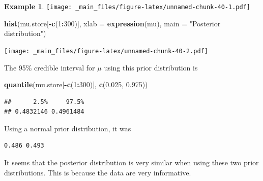 \documentclass[
]{book}
\newenvironment{Shaded}{\begin{snugshade}}{\end{snugshade}}
\newcommand{\AttributeTok}[1]{\textcolor[rgb]{0.13,0.29,0.53}{#1}}
\newcommand{\DecValTok}[1]{\textcolor[rgb]{0.00,0.00,0.81}{#1}}
\newcommand{\FloatTok}[1]{\textcolor[rgb]{0.00,0.00,0.81}{#1}}
\newcommand{\FunctionTok}[1]{\textcolor[rgb]{0.13,0.29,0.53}{\textbf{#1}}}
\newcommand{\NormalTok}[1]{#1}
\newcommand{\SpecialCharTok}[1]{\textcolor[rgb]{0.81,0.36,0.00}{\textbf{#1}}}
\newcommand{\StringTok}[1]{\textcolor[rgb]{0.31,0.60,0.02}{#1}}
\theoremstyle{definition}
\theoremstyle{definition}
\newtheorem{example}{Example}[chapter]
\theoremstyle{definition}
\theoremstyle{definition}
\theoremstyle{remark}
\begin{document}
\begin{example}
\texttt{[image: \_main\_files/figure-latex/unnamed-chunk-40-1.pdf]}

\begin{Shaded}
\begin{Highlighting}[]
\FunctionTok{hist}\NormalTok{(mu.store[}\SpecialCharTok{{-}}\FunctionTok{c}\NormalTok{(}\DecValTok{1}\SpecialCharTok{:}\DecValTok{300}\NormalTok{)], }\AttributeTok{xlab =} \FunctionTok{expression}\NormalTok{(mu), }\AttributeTok{main =} \StringTok{"Posterior distribution"}\NormalTok{)}
\end{Highlighting}
\end{Shaded}

\texttt{[image: \_main\_files/figure-latex/unnamed-chunk-40-2.pdf]}

The 95\% credible interval for \(\mu\) using this prior distribution is

\begin{Shaded}
\begin{Highlighting}[]
\FunctionTok{quantile}\NormalTok{(mu.store[}\SpecialCharTok{{-}}\FunctionTok{c}\NormalTok{(}\DecValTok{1}\SpecialCharTok{:}\DecValTok{300}\NormalTok{)], }\FunctionTok{c}\NormalTok{(}\FloatTok{0.025}\NormalTok{, }\FloatTok{0.975}\NormalTok{))}
\end{Highlighting}
\end{Shaded}

\begin{verbatim}
##      2.5%     97.5% 
## 0.4832146 0.4961484
\end{verbatim}

Using a normal prior distribution, it was

\begin{verbatim}
0.486 0.493
\end{verbatim}

It seems that the posterior distribution is very similar when using these two prior distributions. This is because the data are very informative.
\end{example}
\end{document}
